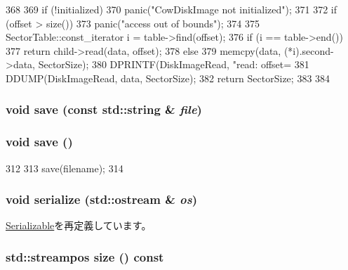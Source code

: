\begin{DoxyCode}
368 {
369     if (!initialized)
370         panic("CowDiskImage not initialized");
371 
372     if (offset > size())
373         panic("access out of bounds");
374 
375     SectorTable::const_iterator i = table->find(offset);
376     if (i == table->end())
377         return child->read(data, offset);
378     else {
379         memcpy(data, (*i).second->data, SectorSize);
380         DPRINTF(DiskImageRead, "read: offset=%
381         DDUMP(DiskImageRead, data, SectorSize);
382         return SectorSize;
383     }
384 }
\end{DoxyCode}
\hypertarget{classCowDiskImage_a7b34aadc98977c91db5b87747f7e7ea9}{
\subsubsection[{save}]{\setlength{\rightskip}{0pt plus 5cm}void save (const std::string \& {\em file})}}
\label{classCowDiskImage_a7b34aadc98977c91db5b87747f7e7ea9}
\hypertarget{classCowDiskImage_aae2c382151ef7c9aa913361172b30db6}{
\subsubsection[{save}]{\setlength{\rightskip}{0pt plus 5cm}void save ()}}
\label{classCowDiskImage_aae2c382151ef7c9aa913361172b30db6}



\begin{DoxyCode}
312 {
313     save(filename);
314 }
\end{DoxyCode}
\hypertarget{classCowDiskImage_a53e036786d17361be4c7320d39c99b84}{
\subsubsection[{serialize}]{\setlength{\rightskip}{0pt plus 5cm}void serialize (std::ostream \& {\em os})}}
\label{classCowDiskImage_a53e036786d17361be4c7320d39c99b84}


\hyperlink{classSerializable_ad6272f80ae37e8331e3969b3f072a801}{Serializable}を再定義しています。\hypertarget{classCowDiskImage_ac47c8c9bb5ae5fbfa7e05b464d3e20d4}{
\subsubsection[{size}]{\setlength{\rightskip}{0pt plus 5cm}std::streampos size () const}}
\label{classCowDiskImage_ac47c8c9bb5ae5fbfa7e05b464d3e20d4}


